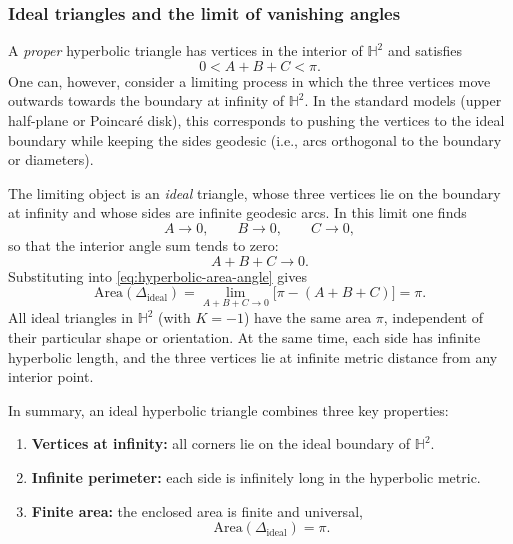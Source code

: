 \documentclass[10pt,reprint,aps,onecolumn,nofootinbib]{revtex4-2}
\begin{document}
\subsubsection{Ideal triangles and the limit of vanishing angles}

    A \emph{proper} hyperbolic triangle has vertices in the interior of $\mathbb{H}^2$ and satisfies
    \begin{equation}
        0 < A + B + C < \pi.
    \end{equation}
    One can, however, consider a limiting process in which the three vertices move outwards towards the boundary at infinity of $\mathbb{H}^2$. In the standard models (upper half-plane or Poincar\'e disk), this corresponds to pushing the vertices to the ideal boundary while keeping the sides geodesic (i.e., arcs orthogonal to the boundary or diameters).

    The limiting object is an \emph{ideal} triangle, whose three vertices lie on the boundary at infinity and whose sides are infinite geodesic arcs. In this limit one finds
    \begin{equation}
        A \to 0, \qquad B \to 0, \qquad C \to 0,
    \end{equation}
    so that the interior angle sum tends to zero:
    \begin{equation}
        A + B + C \longrightarrow 0.
    \end{equation}
    Substituting into \eqref{eq:hyperbolic-area-angle} gives
    \begin{equation}
        \text{Area}(\Delta_{\text{ideal}}) = \lim_{A+B+C \to 0} \bigl[\pi - (A + B + C)\bigr]
        = \pi.
        \label{eq:ideal-triangle-area}
    \end{equation}
    All ideal triangles in $\mathbb{H}^2$ (with $K=-1$) have the same area $\pi$, independent of their particular shape or orientation. At the same time, each side has infinite hyperbolic length, and the three vertices lie at infinite metric distance from any interior point.

    In summary, an ideal hyperbolic triangle combines three key properties:
    \begin{enumerate}
        \item \textbf{Vertices at infinity:} all corners lie on the ideal boundary of $\mathbb{H}^2$.
        \item \textbf{Infinite perimeter:} each side is infinitely long in the hyperbolic metric.
        \item \textbf{Finite area:} the enclosed area is finite and universal,
        \begin{equation}
            \text{Area}(\Delta_{\text{ideal}}) = \pi.
        \end{equation}
    \end{enumerate}
\end{document}
